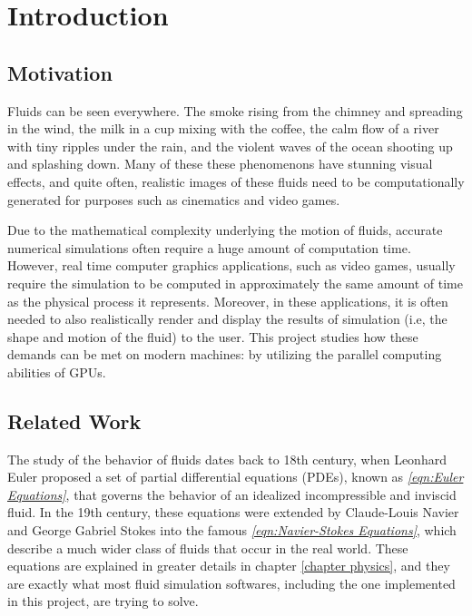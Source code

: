 \chapter{Introduction}

\section{Motivation}
Fluids can be seen everywhere. The smoke rising from the chimney and spreading in the wind, the milk in a cup mixing with the coffee, the calm flow of a river with tiny ripples under the rain, and the violent waves of the ocean shooting up and splashing down. Many of these these phenomenons have stunning visual effects, and quite often, realistic images of these fluids need to be computationally generated for purposes such as cinematics and video games. 


Due to the mathematical complexity underlying the motion of fluids, accurate numerical simulations often require a huge amount of computation time. However, real time computer graphics applications, such as video games, usually require the simulation to be computed in approximately the same amount of time as the physical process it represents. Moreover, in these applications, it is often needed to also realistically render and display the results of simulation (i.e, the shape and motion of the fluid) to the user. This project studies how these demands can be met on modern machines: by utilizing the parallel computing abilities of GPUs.





\section{Related Work}



The study of the behavior of fluids dates back to 18th century, when Leonhard Euler proposed a set of partial differential equations (PDEs), known as \textit{\ref{eqn:Euler Equations}}, that governs the behavior of an idealized incompressible and inviscid fluid. In the 19th century, these equations were extended by Claude-Louis Navier and George Gabriel Stokes into the famous \textit{\ref{eqn:Navier-Stokes Equations}}, which describe a much wider class of fluids that occur in the real world. These equations are explained in greater details in chapter \ref{chapter physics}, and they are exactly what most fluid simulation softwares, including the one implemented in this project, are trying to solve. 

